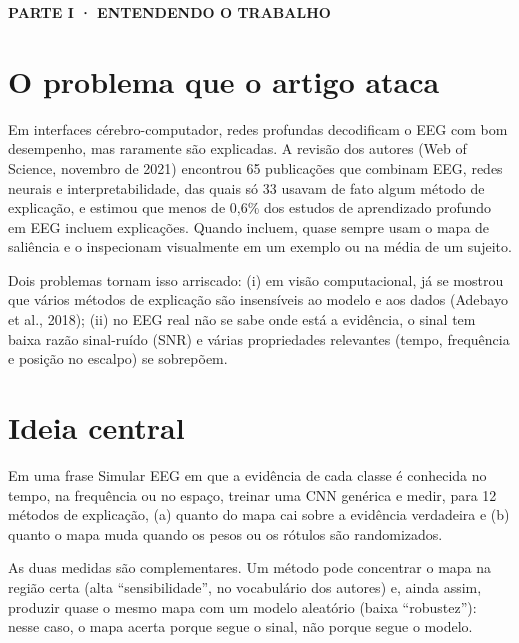 \documentclass[11pt,a4paper]{article}
\newcommand{\partbar}[1]{\par\vspace{1.2em}\noindent\colorbox{black!80}{\parbox{\dimexpr\linewidth-2\fboxsep}{\color{white}\bfseries\sffamily\MakeUppercase{#1}}}\par\vspace{0.4em}}
\begin{document}
\partbar{Parte I · Entendendo o trabalho}

\section{O problema que o artigo ataca}
Em interfaces cérebro-computador, redes profundas decodificam o EEG com bom desempenho, mas raramente são explicadas. A revisão dos autores (Web of Science, novembro de 2021) encontrou 65 publicações que combinam EEG, redes neurais e interpretabilidade, das quais só 33 usavam de fato algum método de explicação, e estimou que menos de 0,6\% dos estudos de aprendizado profundo em EEG incluem explicações. Quando incluem, quase sempre usam o mapa de saliência e o inspecionam visualmente em um exemplo ou na média de um sujeito.

Dois problemas tornam isso arriscado: (i) em visão computacional, já se mostrou que vários métodos de explicação são insensíveis ao modelo e aos dados (Adebayo et al., 2018); (ii) no EEG real não se sabe onde está a evidência, o sinal tem baixa razão sinal-ruído (SNR) e várias propriedades relevantes (tempo, frequência e posição no escalpo) se sobrepõem.

\section{Ideia central}
\begin{infobox}[note]{Em uma frase}
Simular EEG em que a evidência de cada classe é conhecida no tempo, na frequência ou no espaço, treinar uma CNN genérica e medir, para 12 métodos de explicação, (a) quanto do mapa cai sobre a evidência verdadeira e (b) quanto o mapa muda quando os pesos ou os rótulos são randomizados.
\end{infobox}
As duas medidas são complementares. Um método pode concentrar o mapa na região certa (alta “sensibilidade”, no vocabulário dos autores) e, ainda assim, produzir quase o mesmo mapa com um modelo aleatório (baixa “robustez”): nesse caso, o mapa acerta porque segue o sinal, não porque segue o modelo.
\end{document}
